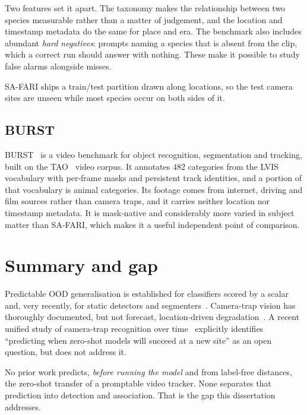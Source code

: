 Two features set it apart. The taxonomy makes the relationship between two species measurable rather than a
matter of judgement, and the location and timestamp metadata do the same for place and era. The benchmark
also includes abundant \emph{hard negatives}: prompts naming a species that is absent from the clip, which a
correct run should answer with nothing. These make it possible to study false alarms alongside misses.

SA-FARI ships a train/test partition drawn along locations, so the test camera sites are unseen while most
species occur on both sides of it.

\subsection{BURST}
\label{sec:bg-burst}
BURST~\cite{burst} is a video benchmark for object recognition, segmentation and tracking,
built on the TAO~\cite{tao} video corpus. It annotates $482$ categories from the LVIS~\cite{lvis} vocabulary
with per-frame masks and persistent track identities, and a portion of that vocabulary is animal categories.
Its footage comes from internet, driving and film sources rather than camera traps, and it carries neither
location nor timestamp metadata. It is mask-native and considerably more varied in subject matter than
SA-FARI, which makes it a useful independent point of comparison.

\section{Summary and gap}
\label{sec:bg-gap}
Predictable OOD generalisation is established for classifiers scored by a scalar~\cite{aotl,agl,atc,autoeval}
and, very recently, for static detectors and segmenters~\cite{pcr,rca}. Camera-trap vision has thoroughly
documented, but not forecast, location-driven degradation~\cite{terra,wilds,panaf}. A recent unified study
of camera-trap recognition over time~\cite{jeon} explicitly identifies ``predicting when zero-shot models
will succeed at a new site'' as an open question, but does not address it.

No prior work predicts, \emph{before running the model} and from label-free distances, the zero-shot transfer
of a promptable video tracker. None separates that prediction into detection and association. That is the gap
this dissertation addresses.
